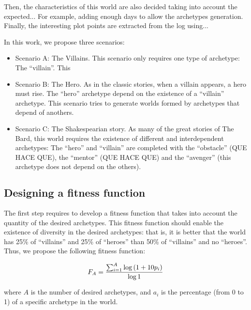 \documentclass[runningheads,a4paper]{llncs}
\begin{document}
Then, the characteristics of this world are also decided taking into account the expected... For example, adding enough days to allow the archetypes generation. Finally, the interesting plot points are extracted from the log using... %

In this work, we propose three scenarios:
\begin{itemize}
\item Scenario A: The Villains. This scenario only requires one type of archetype: The ``villain''. This %
\item Scenario B: The Hero. As in the classic stories, when a villain appears, a hero must rise. The ``hero'' archetype depend on the existence of a ``villain'' archetype. This scenario tries to generate worlds formed by archetypes that depend of anothers.
\item Scenario C: The Shakespearian story. As many of the great stories of The Bard, this world requires the existence of different and interdependent archetypes: The ``hero'' and ``villain'' are completed with the ``obstacle'' (QUE HACE QUE), the  ``mentor'' (QUE HACE QUE) and the ``avenger'' (this archetype does not depend on the others).

\end{itemize}

\subsection{Designing a fitness function}


The first step requires to develop a fitness function that takes into
account the quantity of the desired archetypes. This fitness function
should enable the existence of diversity in the desired
archetypes: that is, it is better that the world has 25\% of
``villains'' and 25\% of ``heroes'' than 50\% of ``villains'' and no
``heroes''. Thus, we propose the following fitness function: 

\begin{equation}
F_A= {\sum _{i=1}^{A} {\log \left( 1+10p_{i}\right) } \over {\log 1}}
\end{equation}

where $A$ is the number of desired archetypes, and $a_{i}$ is the
percentage (from 0 to 1) of a specific archetype in the world. %
\end{document}
